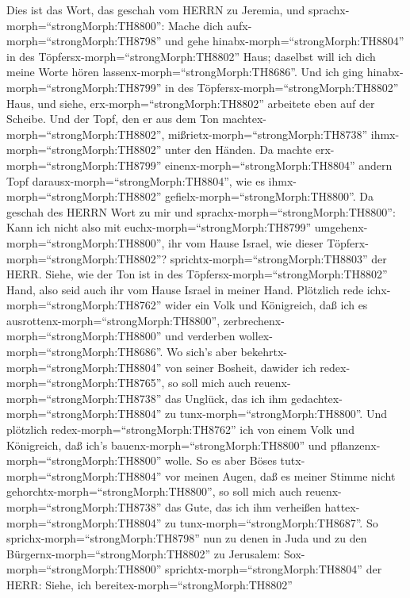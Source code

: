  Dies ist das Wort, das geschah vom HERRN zu Jeremia, und
sprachx-morph=``strongMorph:TH8800'':  Mache dich
aufx-morph=``strongMorph:TH8798'' und gehe
hinabx-morph=``strongMorph:TH8804'' in des
Töpfersx-morph=``strongMorph:TH8802'' Haus; daselbst will ich dich meine
Worte hören lassenx-morph=``strongMorph:TH8686''.  Und ich
ging hinabx-morph=``strongMorph:TH8799'' in des
Töpfersx-morph=``strongMorph:TH8802'' Haus, und siehe,
erx-morph=``strongMorph:TH8802'' arbeitete eben auf der Scheibe.
 Und der Topf, den er aus dem Ton
machtex-morph=``strongMorph:TH8802'',
mißrietx-morph=``strongMorph:TH8738'' ihmx-morph=``strongMorph:TH8802''
unter den Händen. Da machte erx-morph=``strongMorph:TH8799''
einenx-morph=``strongMorph:TH8804'' andern Topf
darausx-morph=``strongMorph:TH8804'', wie es
ihmx-morph=``strongMorph:TH8802'' gefielx-morph=``strongMorph:TH8800''.
 Da geschah des HERRN Wort zu mir und
sprachx-morph=``strongMorph:TH8800'':  Kann ich nicht also
mit euchx-morph=``strongMorph:TH8799''
umgehenx-morph=``strongMorph:TH8800'', ihr vom Hause Israel, wie dieser
Töpferx-morph=``strongMorph:TH8802''?
sprichtx-morph=``strongMorph:TH8803'' der HERR. Siehe, wie der Ton ist
in des Töpfersx-morph=``strongMorph:TH8802'' Hand, also seid auch ihr
vom Hause Israel in meiner Hand.  Plötzlich rede
ichx-morph=``strongMorph:TH8762'' wider ein Volk und Königreich, daß ich
es ausrottenx-morph=``strongMorph:TH8800'',
zerbrechenx-morph=``strongMorph:TH8800'' und verderben
wollex-morph=``strongMorph:TH8686''.  Wo sich's aber
bekehrtx-morph=``strongMorph:TH8804'' von seiner Bosheit, dawider ich
redex-morph=``strongMorph:TH8765'', so soll mich auch
reuenx-morph=``strongMorph:TH8738'' das Unglück, das ich ihm
gedachtex-morph=``strongMorph:TH8804'' zu
tunx-morph=``strongMorph:TH8800''.  Und plötzlich
redex-morph=``strongMorph:TH8762'' ich von einem Volk und Königreich,
daß ich's bauenx-morph=``strongMorph:TH8800'' und
pflanzenx-morph=``strongMorph:TH8800'' wolle.  So es aber
Böses tutx-morph=``strongMorph:TH8804'' vor meinen Augen, daß es meiner
Stimme nicht gehorchtx-morph=``strongMorph:TH8800'', so soll mich auch
reuenx-morph=``strongMorph:TH8738'' das Gute, das ich ihm verheißen
hattex-morph=``strongMorph:TH8804'' zu
tunx-morph=``strongMorph:TH8687''.  So
sprichx-morph=``strongMorph:TH8798'' nun zu denen in Juda und zu den
Bürgernx-morph=``strongMorph:TH8802'' zu Jerusalem:
Sox-morph=``strongMorph:TH8800'' sprichtx-morph=``strongMorph:TH8804''
der HERR: Siehe, ich bereitex-morph=``strongMorph:TH8802''
